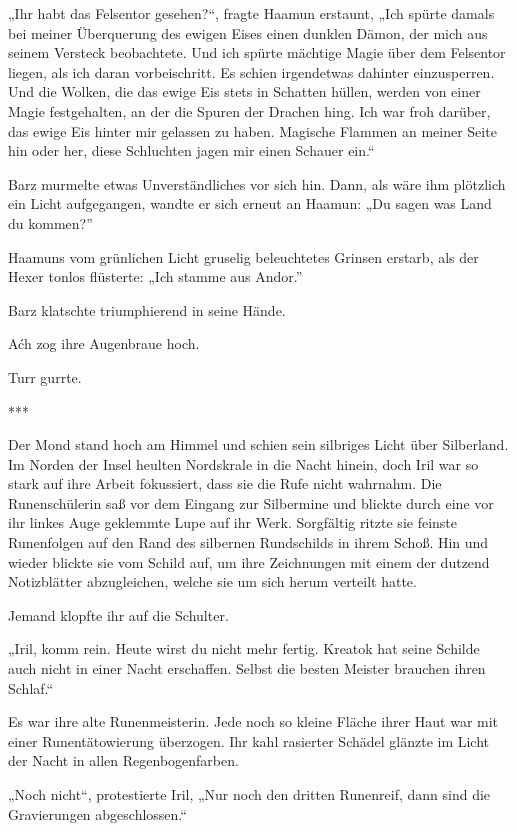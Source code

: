 „Ihr habt das Felsentor gesehen?“, fragte Haamun erstaunt, „Ich spürte damals bei meiner Überquerung des ewigen Eises einen dunklen Dämon, der mich aus seinem Versteck beobachtete. Und ich spürte mächtige Magie über dem Felsentor liegen, als ich daran vorbeischritt. Es schien irgendetwas dahinter einzusperren. Und die Wolken, die das ewige Eis stets in Schatten hüllen, werden von einer Magie festgehalten, an der die Spuren der Drachen hing. Ich war froh darüber, das ewige Eis hinter mir gelassen zu haben. Magische Flammen an meiner Seite hin oder her, diese Schluchten jagen mir einen Schauer ein.“

Barz murmelte etwas Unverständliches vor sich hin. Dann, als wäre ihm plötzlich ein Licht aufgegangen, wandte er sich erneut an Haamun: „Du sagen was Land du kommen?”

Haamuns vom grünlichen Licht gruselig beleuchtetes Grinsen erstarb, als der Hexer tonlos flüsterte: „Ich stamme aus Andor.”

Barz klatschte triumphierend in seine Hände.

Aćh zog ihre Augenbraue hoch.

Turr gurrte.\bigskip

***\bigskip

Der Mond stand hoch am Himmel und schien sein silbriges Licht über Silberland. Im Norden der Insel heulten Nordskrale in die Nacht hinein, doch Iril war so stark auf ihre Arbeit fokussiert, dass sie die Rufe nicht wahrnahm. Die Runenschülerin saß vor dem Eingang zur Silbermine und blickte durch eine vor ihr linkes Auge geklemmte Lupe auf ihr Werk. Sorgfältig ritzte sie feinste Runenfolgen auf den Rand des silbernen Rundschilds in ihrem Schoß. Hin und wieder blickte sie vom Schild auf, um ihre Zeichnungen mit einem der dutzend Notizblätter abzugleichen, welche sie um sich herum verteilt hatte.

Jemand klopfte ihr auf die Schulter.

„Iril, komm rein. Heute wirst du nicht mehr fertig. Kreatok hat seine Schilde auch nicht in einer Nacht erschaffen. Selbst die besten Meister brauchen ihren Schlaf.“

Es war ihre alte Runenmeisterin. Jede noch so kleine Fläche ihrer Haut war mit einer Runentätowierung überzogen. Ihr kahl rasierter Schädel glänzte im Licht der Nacht in allen Regenbogenfarben.

„Noch nicht“, protestierte Iril, „Nur noch den dritten Runenreif, dann sind die Gravierungen abgeschlossen.“

